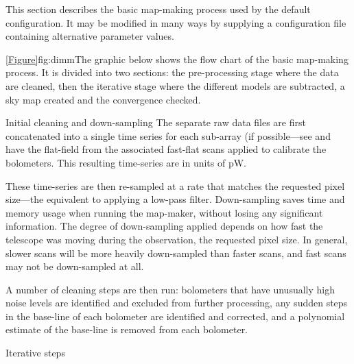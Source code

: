 This section describes the basic map-making process used by the
default configuration.  It may be modified in many ways by supplying a
configuration file containing alternative parameter values.

\cref{Figure}{fig:dimm}{The graphic below} shows the flow chart of the
basic map-making process. It is divided into two sections: the pre-processing
stage where the data are cleaned, then the iterative stage where the different
models are subtracted, a sky map created and the convergence checked.


\begin{enumdesc}
\item[Initial cleaning and down-sampling]
  The separate raw data files are first concatenated into a single time
  series for each sub-array (if possible---see  and have the flat-field from the associated
  fast-flat scans applied to calibrate the bolometers.  This resulting
  time-series are in units of pW.

  These time-series are then re-sampled at a rate that matches the
  requested pixel size---the equivalent to applying a low-pass filter.
  Down-sampling saves time and memory usage when running the map-maker,
  without losing any significant information. The degree of
  down-sampling applied depends on how fast the telescope was moving
  during the observation, the requested pixel size. In general, slower
  scans will be more heavily down-sampled than faster scans, and fast
  scans may not be down-sampled at all.

  A number of cleaning steps are then run: bolometers that have unusually
  high noise levels are identified and excluded from further processing,
  any sudden steps in the base-line of each bolometer are identified and
  corrected, and a polynomial estimate of the base-line is removed from
  each bolometer.

\item[Iterative steps]


\end{enumdesc}
